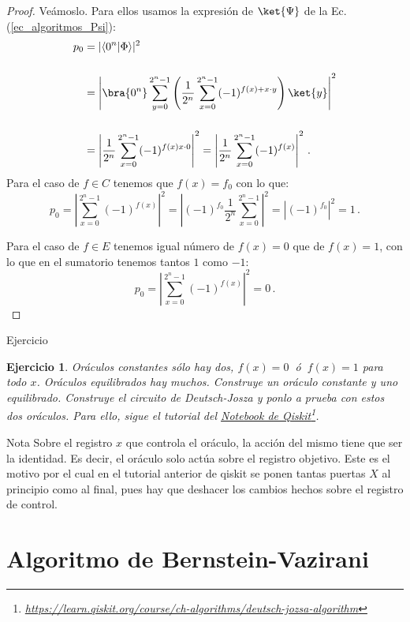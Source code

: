 \documentclass[a4paper,11pt]{book} %
\newtheorem{ejercicio_contador}{Ejercicio}
\newcommand{\Ejercicio}[1]{
		\begin{mybox_gray}{Ejercicio} 
			\begin{ejercicio_contador}
				 #1 
			\end{ejercicio_contador} 
		\end{mybox_gray}
	}
\numberwithin{equation}{chapter}
\newcommand{\braket}[2]{\langle #1|#2\rangle}
\begin{document}
	\begin{proof}
	Veámoslo. Para ellos usamos la expresión de $\ket{\Psi}$ de la Ec. (\ref{ec_algoritmos_Psi}):
	\begin{align*}
	p_{0} &= |\braket{0^n}{\Phi}|^2 \nonumber\\ \rule{0mm}{12mm}
		  &= \left| \bra{0^n} \sum_{y=0}^{2^n-1} \left( \frac{1}{2^n}\sum_{x=0}^{2^n-1}(-1)^{f(x) + x \cdot y} \right)\ket{y} \right|^2 \\ \rule{0mm}{12mm}
	      &= \left| \frac{1}{2^n} \sum_{x=0}^{2^n-1} (-1)^{f(x) x \cdot 0} \right|^2   =  \left| \frac{1}{2^n} \sum_{x=0}^{2^n-1} (-1)^{f(x)} \right|^2 \, .
	\end{align*}
	Para el caso de $f \in C$ tenemos que $f(x) = f_0$ con lo que:
	\begin{equation*}
	p_{0} = \left|  \sum_{x=0}^{2^n-1} (-1)^{f(x)} \right|^2    =  \left| (-1)^{f_0} \frac{1}{2^n} \sum_{x=0}^{2^n-1}  \right|^2  = \left| (-1)^{f_0} \right|^2 = 1  \, .
	\end{equation*}
	
	Para el caso de $f \in E$ tenemos igual número de  $f(x) = 0$ que de $f(x) = 1$, con lo que en el sumatorio tenemos tantos $1$ como $-1$:
	\begin{equation*}
	p_{0} = \left|  \sum_{x=0}^{2^n-1} (-1)^{f(x)} \right|^2    =  0  \, .
	\end{equation*}
	\end{proof}



	\Ejercicio{
	Oráculos constantes sólo hay dos, $f(x)=0~$ ó $~f(x) = 1$ para todo $x$. Oráculos equilibrados hay muchos. Construye un oráculo constante y uno
	equilibrado. Construye el circuito de Deutsch-Josza y ponlo a prueba con estos dos oráculos. Para ello, sigue el tutorial del 
	\href{https://learn.qiskit.org/course/ch-algorithms/deutsch-jozsa-algorithm}{Notebook de Qiskit}\footnote{\url{https://learn.qiskit.org/course/ch-algorithms/deutsch-jozsa-algorithm}}. 
	}

	\begin{mybox_blue}{Nota}
	Sobre el registro $x$ que controla el oráculo, la acción del mismo tiene que ser la identidad. Es decir, el oráculo solo actúa sobre el registro objetivo. Este es el motivo por el cual en el 
	tutorial anterior de qiskit se ponen tantas puertas $X$ al principio como al final, pues hay que deshacer los cambios hechos sobre el registro de control.
	\end{mybox_blue}

	\section{Algoritmo de Bernstein-Vazirani}
		
\end{document}
